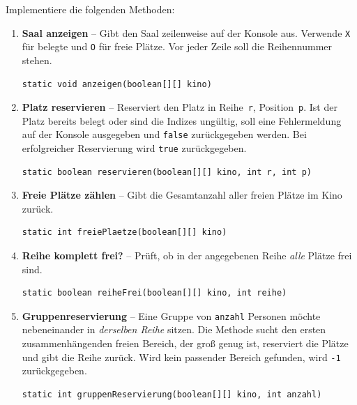 \documentclass[
	fontsize=12pt,          %
	paper=a4,               %
	numbers=noenddot,       %
	listof=totoc,           %
	listof=entryprefix,     %
	listof=nochaptergap,    %
	bibliography=totoc,     %
	parskip=half            %
	openany                 %
]{scrbook}
\begin{document}
\bigskip
Implementiere die folgenden Methoden:

\begin{enumerate}[label=\textbf{\alph*)}]

\item \textbf{Saal anzeigen} -- Gibt den Saal zeilenweise auf der Konsole aus. Verwende \texttt{X} für belegte und \texttt{O} für freie Plätze. Vor jeder Zeile soll die Reihennummer stehen.

\begin{lstlisting}
static void anzeigen(boolean[][] kino)
\end{lstlisting}

\item \textbf{Platz reservieren} -- Reserviert den Platz in Reihe~\texttt{r}, Position~\texttt{p}. Ist der Platz bereits belegt oder sind die Indizes ungültig, soll eine Fehlermeldung auf der Konsole ausgegeben und \texttt{false} zurückgegeben werden. Bei erfolgreicher Reservierung wird \texttt{true} zurückgegeben.

\begin{lstlisting}
static boolean reservieren(boolean[][] kino, int r, int p)
\end{lstlisting}

\item \textbf{Freie Plätze zählen} -- Gibt die Gesamtanzahl aller freien Plätze im Kino zurück.

\begin{lstlisting}
static int freiePlaetze(boolean[][] kino)
\end{lstlisting}

\item \textbf{Reihe komplett frei?} -- Prüft, ob in der angegebenen Reihe \emph{alle} Plätze frei sind.

\begin{lstlisting}
static boolean reiheFrei(boolean[][] kino, int reihe)
\end{lstlisting}

\item \textbf{Gruppenreservierung} -- Eine Gruppe von \texttt{anzahl} Personen möchte nebeneinander in \emph{derselben Reihe} sitzen. Die Methode sucht den ersten zusammenhängenden freien Bereich, der groß genug ist, reserviert die Plätze und gibt die Reihe zurück. Wird kein passender Bereich gefunden, wird \texttt{-1} zurückgegeben.

\begin{lstlisting}
static int gruppenReservierung(boolean[][] kino, int anzahl)
\end{lstlisting}


\end{enumerate}
\end{document}
